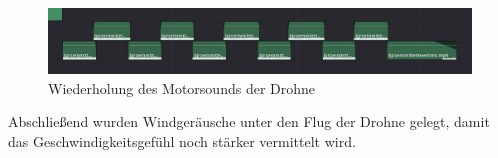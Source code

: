 \begin{figure}[H]
\begin{center}
\includegraphics[width=\textwidth]{gfx/post/sample.jpg}
\caption{Wiederholung des Motorsounds der Drohne}
\label{sample}
\end{center}
\end{figure}

Abschließend wurden Windgeräusche unter den Flug der Drohne gelegt, damit das Geschwindigkeitsgefühl noch stärker vermittelt wird. 